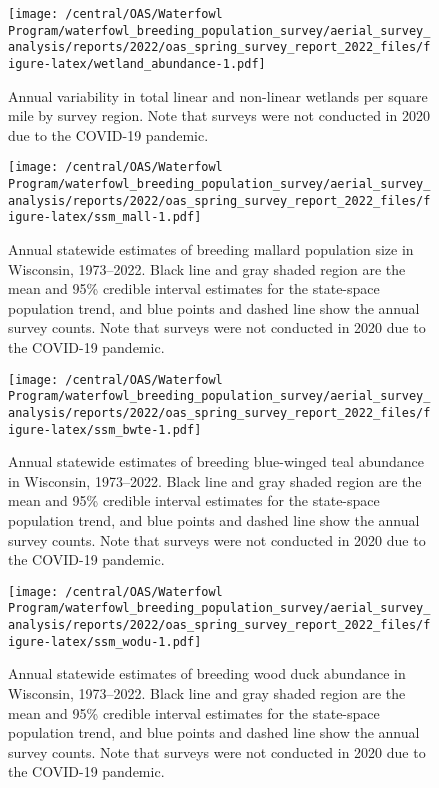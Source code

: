 \documentclass[
  12pt,
]{article}
\begin{document}
\newpage

\begin{figure}
\centering
\texttt{[image: /central/OAS/Waterfowl Program/waterfowl\_breeding\_population\_survey/aerial\_survey\_analysis/reports/2022/oas\_spring\_survey\_report\_2022\_files/figure-latex/wetland\_abundance-1.pdf]}
\caption{\label{fig:wetland_abundance}Annual variability in total linear
and non-linear wetlands per square mile by survey region. Note that
surveys were not conducted in 2020 due to the COVID-19 pandemic.}
\end{figure}

\newpage

\begin{figure}
\centering
\texttt{[image: /central/OAS/Waterfowl Program/waterfowl\_breeding\_population\_survey/aerial\_survey\_analysis/reports/2022/oas\_spring\_survey\_report\_2022\_files/figure-latex/ssm\_mall-1.pdf]}
\caption{\label{fig:ssm_mall}Annual statewide estimates of breeding
mallard population size in Wisconsin, 1973--2022. Black line and gray
shaded region are the mean and 95\% credible interval estimates for the
state-space population trend, and blue points and dashed line show the
annual survey counts. Note that surveys were not conducted in 2020 due
to the COVID-19 pandemic.}
\end{figure}

\newpage

\begin{figure}
\centering
\texttt{[image: /central/OAS/Waterfowl Program/waterfowl\_breeding\_population\_survey/aerial\_survey\_analysis/reports/2022/oas\_spring\_survey\_report\_2022\_files/figure-latex/ssm\_bwte-1.pdf]}
\caption{\label{fig:ssm_bwte}Annual statewide estimates of breeding
blue-winged teal abundance in Wisconsin, 1973--2022. Black line and gray
shaded region are the mean and 95\% credible interval estimates for the
state-space population trend, and blue points and dashed line show the
annual survey counts. Note that surveys were not conducted in 2020 due
to the COVID-19 pandemic.}
\end{figure}

\newpage

\begin{figure}
\centering
\texttt{[image: /central/OAS/Waterfowl Program/waterfowl\_breeding\_population\_survey/aerial\_survey\_analysis/reports/2022/oas\_spring\_survey\_report\_2022\_files/figure-latex/ssm\_wodu-1.pdf]}
\caption{\label{fig:ssm_wodu}Annual statewide estimates of breeding wood
duck abundance in Wisconsin, 1973--2022. Black line and gray shaded
region are the mean and 95\% credible interval estimates for the
state-space population trend, and blue points and dashed line show the
annual survey counts. Note that surveys were not conducted in 2020 due
to the COVID-19 pandemic.}
\end{figure}
\end{document}
